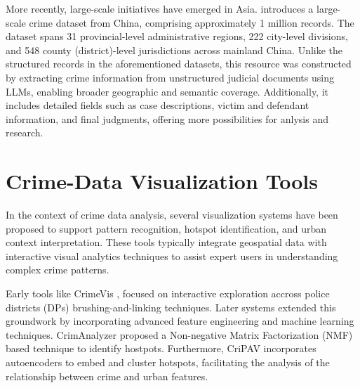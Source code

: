 More recently, large-scale initiatives have emerged in Asia. \cite{Zhang2025CrimeDatasetChina} introduces a large-scale crime dataset from China, comprising approximately 1 million records. The dataset spans 31 provincial-level administrative regions, 222 city-level divisions, and 548 county (district)-level jurisdictions across mainland China. Unlike the structured records in the aforementioned datasets, this resource was constructed by extracting crime information from unstructured judicial documents using LLMs, enabling broader geographic and semantic coverage. Additionally, it includes detailed fields such as case descriptions, victim and defendant information, and final judgments, offering more possibilities for anlysis and research.



\section{Crime-Data Visualization Tools}

In the context of crime data analysis, several visualization systems have been proposed to support pattern recognition, hotspot identification, and urban context interpretation. These tools typically integrate geospatial data with interactive visual analytics techniques to assist expert users in understanding complex crime patterns.

Early tools like CrimeVis \cite{Silva2017CrimeVisAI}, focused on interactive exploration accross police districts (DPs) brushing-and-linking techniques. Later systems extended this groundwork by incorporating advanced feature engineering and machine learning techniques. CrimAnalyzer \cite{Garcia2021CrimAnalyzer} proposed a Non-negative Matrix Factorization (NMF) based technique to identify hostpots. Furthermore, CriPAV \cite{Garcia2022CriPAV} incorporates autoencoders to embed and cluster hotspots, facilitating the analysis of the relationship between crime and urban features.


\cite{Garcia2020MiranteAV}






